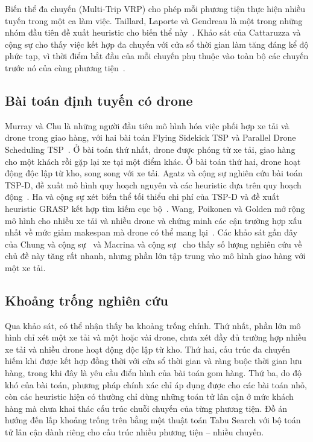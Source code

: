 \documentclass[../DoAn.tex]{subfiles}
\begin{document}
Biến thể đa chuyến (Multi-Trip VRP) cho phép mỗi phương tiện thực hiện nhiều tuyến trong một ca làm việc. Taillard, Laporte và Gendreau là một trong những nhóm đầu tiên đề xuất heuristic cho biến thể này~\cite{taillard1996vehicle}. Khảo sát của Cattaruzza và cộng sự cho thấy việc kết hợp đa chuyến với cửa sổ thời gian làm tăng đáng kể độ phức tạp, vì thời điểm bắt đầu của mỗi chuyến phụ thuộc vào toàn bộ các chuyến trước nó của cùng phương tiện~\cite{cattaruzza2016multitrip}.

\subsection{Bài toán định tuyến có drone}

Murray và Chu là những người đầu tiên mô hình hóa việc phối hợp xe tải và drone trong giao hàng, với hai bài toán Flying Sidekick TSP và Parallel Drone Scheduling TSP~\cite{murray2015flying}. Ở bài toán thứ nhất, drone được phóng từ xe tải, giao hàng cho một khách rồi gặp lại xe tại một điểm khác. Ở bài toán thứ hai, drone hoạt động độc lập từ kho, song song với xe tải. Agatz và cộng sự nghiên cứu bài toán TSP-D, đề xuất mô hình quy hoạch nguyên và các heuristic dựa trên quy hoạch động~\cite{agatz2018optimization}. Ha và cộng sự xét biến thể tối thiểu chi phí của TSP-D và đề xuất heuristic GRASP kết hợp tìm kiếm cục bộ~\cite{ha2018min}. Wang, Poikonen và Golden mở rộng mô hình cho nhiều xe tải và nhiều drone và chứng minh các cận trường hợp xấu nhất về mức giảm makespan mà drone có thể mang lại~\cite{wang2017vehicle}. Các khảo sát gần đây của Chung và cộng sự~\cite{chung2020optimization} và Macrina và cộng sự~\cite{macrina2020drone} cho thấy số lượng nghiên cứu về chủ đề này tăng rất nhanh, nhưng phần lớn tập trung vào mô hình giao hàng với một xe tải.

\subsection{Khoảng trống nghiên cứu}

Qua khảo sát, có thể nhận thấy ba khoảng trống chính. Thứ nhất, phần lớn mô hình chỉ xét một xe tải và một hoặc vài drone, chưa xét đầy đủ trường hợp nhiều xe tải và nhiều drone hoạt động độc lập từ kho. Thứ hai, cấu trúc đa chuyến hiếm khi được kết hợp đồng thời với cửa sổ thời gian và ràng buộc thời gian lưu hàng, trong khi đây là yêu cầu điển hình của bài toán gom hàng. Thứ ba, do độ khó của bài toán, phương pháp chính xác chỉ áp dụng được cho các bài toán nhỏ, còn các heuristic hiện có thường chỉ dùng những toán tử lân cận ở mức khách hàng mà chưa khai thác cấu trúc chuỗi chuyến của từng phương tiện. Đồ án hướng đến lấp khoảng trống trên bằng một thuật toán Tabu Search với bộ toán tử lân cận dành riêng cho cấu trúc nhiều phương tiện -- nhiều chuyến.
\end{document}
